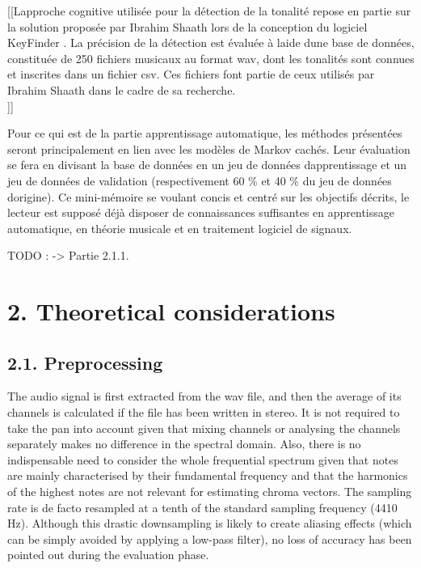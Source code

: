 \documentclass[letterpaper]{article}
\begin{document}
[[L\textquotesingle approche cognitive utilisée pour la détection de la tonalité repose en partie
sur la solution proposée par Ibrahim Sha\textquotesingle ath lors 
de la conception du logiciel KeyFinder \citep{IS}. La précision de la détection est évaluée 
à l\textquotesingle aide d\textquotesingle une base 
de données, constituée de 250 fichiers musicaux au format wav, dont les tonalités sont connues
et inscrites dans un fichier csv. Ces fichiers font partie de ceux utilisés par 
Ibrahim Sha\textquotesingle ath dans le cadre de sa recherche.\\]]

Pour ce qui est de la partie apprentissage automatique, les méthodes présentées seront principalement
en lien avec les modèles de Markov cachés. Leur évaluation se fera en divisant la base de données en
un jeu de données d\textquotesingle apprentissage et un jeu de données de validation (respectivement
60 \% et 40 \% du jeu de données d\textquotesingle origine). Ce mini-mémoire se voulant concis et 
centré sur les objectifs décrits, le lecteur est supposé déjà disposer de connaissances suffisantes en 
apprentissage automatique, en théorie musicale et en traitement logiciel de signaux.

TODO : \citep{SP} \citep{AT} -> Partie 2.1.1.

\section*{2. Theoretical considerations}

\subsection*{2.1. Preprocessing}

The audio signal is first extracted from the wav file, and then the average of its channels is calculated
if the file has been written in stereo. It is not required to take the pan into account given that mixing
channels or analysing the channels separately makes no difference in the spectral domain. Also, there is
no indispensable need to consider the whole frequential spectrum given that notes are mainly characterised 
by their fundamental frequency
and that the harmonics of the highest notes are not relevant for estimating chroma vectors.
The sampling rate is de facto resampled at a tenth of the standard sampling frequency (4410 Hz).
Although this drastic downsampling is likely to create aliasing effects (which can be simply avoided by 
applying a low-pass filter), no loss of accuracy has been pointed out during the evaluation phase.
\end{document}
